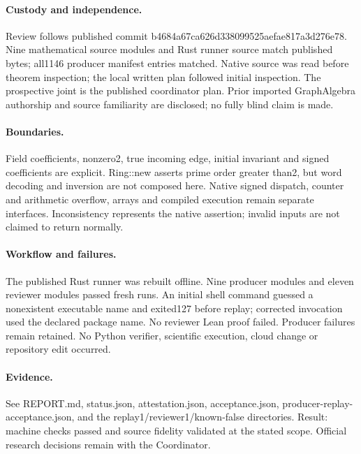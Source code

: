 \documentclass[10pt]{article}
\begin{document}
\paragraph{Custody and independence.}
Review follows published commit b4684a67ca626d338099525aefae817a3d276e78. Nine mathematical source modules and Rust runner source match published bytes; all1146 producer manifest entries matched. Native source was read before theorem inspection; the local written plan followed initial inspection. The prospective joint is the published coordinator plan. Prior imported GraphAlgebra authorship and source familiarity are disclosed; no fully blind claim is made.

\paragraph{Boundaries.}
Field coefficients, nonzero2, true incoming edge, initial invariant and signed coefficients are explicit. Ring::new asserts prime order greater than2, but word decoding and inversion are not composed here. Native signed dispatch, counter and arithmetic overflow, arrays and compiled execution remain separate interfaces. Inconsistency represents the native assertion; invalid inputs are not claimed to return normally.

\paragraph{Workflow and failures.}
The published Rust runner was rebuilt offline. Nine producer modules and eleven reviewer modules passed fresh runs. An initial shell command guessed a nonexistent executable name and exited127 before replay; corrected invocation used the declared package name. No reviewer Lean proof failed. Producer failures remain retained. No Python verifier, scientific execution, cloud change or repository edit occurred.

\paragraph{Evidence.}
See REPORT.md, status.json, attestation.json, acceptance.json, producer-replay-acceptance.json, and the replay1/reviewer1/known-false directories. Result: machine checks passed and source fidelity validated at the stated scope. Official research decisions remain with the Coordinator.
\end{document}
